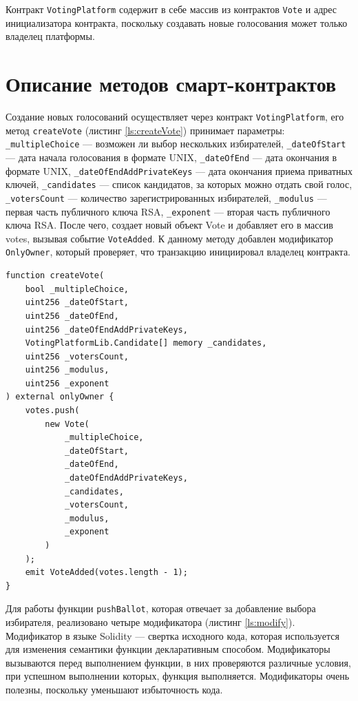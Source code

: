 Контракт \verb|VotingPlatform| содержит в себе массив из контрактов \verb|Vote| и адрес инициализатора контракта, поскольку создавать новые голосования может только владелец платформы.

\section{Описание методов смарт-контрактов}

Создание новых голосований осуществляет через контракт \verb|VotingPlatform|, его метод \verb|createVote| (листинг \ref{ls:createVote}) принимает параметры: \verb|_multipleChoice| — возможен ли выбор нескольких избирателей, \verb|_dateOfStart| — дата начала голосования в формате UNIX, \verb|_dateOfEnd| — дата окончания в формате UNIX, \verb|_dateOfEndAddPrivateKeys| — дата окончания приема приватных ключей, \verb|_candidates| — список кандидатов, за которых можно отдать свой голос, \verb|_votersCount| — количество зарегистрированных избирателей, \verb|_modulus| — первая часть публичного ключа RSA, \verb|_exponent| — вторая часть публичного ключа RSA. После чего, создает новый объект Vote и добавляет его в массив votes, вызывая событие \verb|VoteAdded|. К данному методу добавлен модификатор \verb|OnlyOwner|, который проверяет, что транзакцию инициировал владелец контракта.

\begin{lstlisting}[caption={Создание нового голосования}, label={ls:createVote}]
function createVote(
    bool _multipleChoice,
    uint256 _dateOfStart,
    uint256 _dateOfEnd,
    uint256 _dateOfEndAddPrivateKeys,
    VotingPlatformLib.Candidate[] memory _candidates,
    uint256 _votersCount,
    uint256 _modulus,
    uint256 _exponent
) external onlyOwner {
    votes.push(
        new Vote(
            _multipleChoice,
            _dateOfStart,
            _dateOfEnd,
            _dateOfEndAddPrivateKeys,
            _candidates,
            _votersCount,
            _modulus,
            _exponent
        )
    );
    emit VoteAdded(votes.length - 1);
}
\end{lstlisting}

Для работы функции \verb|pushBallot|, которая отвечает за добавление выбора избирателя, реализовано четыре модификатора (листинг \ref{ls:modify}). Модификатор в языке Solidity — свертка исходного кода, которая используется для изменения семантики функции декларативным способом. Модификаторы вызываются перед выполнением функции, в них проверяются различные условия, при успешном выполнении которых, функция выполняется. Модификаторы очень полезны, поскольку уменьшают избыточность кода.

